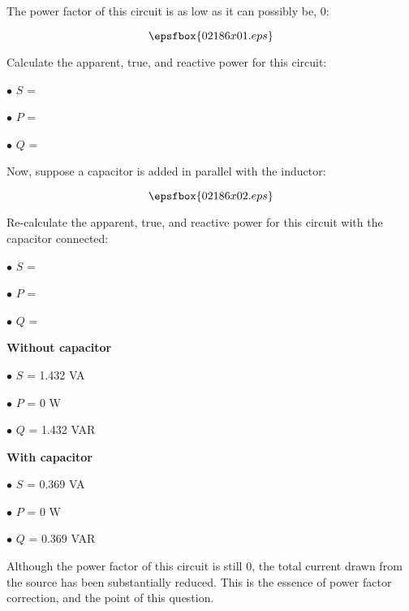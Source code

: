 

The power factor of this circuit is as low as it can possibly be, 0:

$$\epsfbox{02186x01.eps}$$

Calculate the apparent, true, and reactive power for this circuit:

\medskip
\goodbreak
\item{$\bullet$} $S$ =
\item{$\bullet$} $P$ = 
\item{$\bullet$} $Q$ =
\medskip

Now, suppose a capacitor is added in parallel with the inductor:

$$\epsfbox{02186x02.eps}$$

Re-calculate the apparent, true, and reactive power for this circuit with the capacitor connected:

\medskip
\goodbreak
\item{$\bullet$} $S$ = 
\item{$\bullet$} $P$ = 
\item{$\bullet$} $Q$ = 
\medskip







\medskip
\goodbreak
\item{} {\bf Without capacitor}
\item{$\bullet$} $S$ = 1.432 VA
\item{$\bullet$} $P$ = 0 W
\item{$\bullet$} $Q$ = 1.432 VAR
\medskip

\medskip
\goodbreak
\item{} {\bf With capacitor}
\item{$\bullet$} $S$ = 0.369 VA
\item{$\bullet$} $P$ = 0 W
\item{$\bullet$} $Q$ = 0.369 VAR
\medskip







Although the power factor of this circuit is still 0, the total current drawn from the source has been substantially reduced.  This is the essence of power factor correction, and the point of this question.





